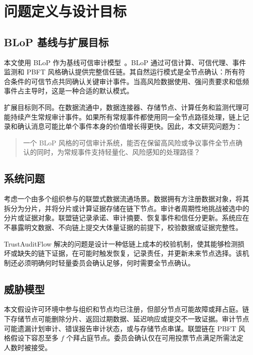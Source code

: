 \section{问题定义与设计目标}

\subsection{BLoP 基线与扩展目标}

本文使用 BLoP 作为基线可信审计模型~\cite{Zhang2025BloPAT}。BLoP 通过可信计算、可信代理、事件监测和 PBFT 风格确认提供完整信任链。其自然运行模式是全节点确认：所有符合条件的可信节点共同确认关键审计事件。当高风险数据使用、强问责要求和低频事件占主导时，这是一种合适的默认模式。

扩展目标则不同。在数据流通中，数据连接器、存储节点、计算任务和监测代理可能持续产生常规审计事件。如果所有常规事件都使用同一全节点路径处理，链上记录和确认消息可能比单个事件本身的价值增长得更快。因此，本文研究问题为：

\begin{quote}
一个 BLoP 风格的可信审计系统，能否在保留高风险或争议事件全节点确认的同时，为常规事件支持轻量化、风险感知的处理路径？
\end{quote}

\subsection{系统问题}

考虑一个由多个组织参与的联盟式数据流通场景。数据拥有方注册数据对象，将其拆分为分片，并将分片或计算证据存储在链下节点。审计者周期性地挑战被选中的分片或证据对象。联盟链记录承诺、审计摘要、恢复事件和信任分更新。系统应在不暴露明文数据、不向链上提交大体量证据的前提下，校验数据或证据完整性。

TrustAuditFlow 解决的问题是设计一种低链上成本的校验机制，使其能够检测损坏或缺失的链下证据，在可能时触发恢复，记录责任，并更新未来节点选择。该机制还必须明确何时轻量委员会确认足够，何时需要全节点确认。

\subsection{威胁模型}

本文假设许可环境中参与组织和节点均已注册，但部分节点可能故障或拜占庭。链下存储节点可能删除分片、返回过期数据、延迟响应或提交不一致证据。审计节点可能遗漏计划审计、错误报告审计状态，或与存储节点串谋。联盟链在 PBFT 风格假设下容忍至多 $f$ 个拜占庭节点。委员会确认仅在可用投票节点满足所需法定人数时被接受。

